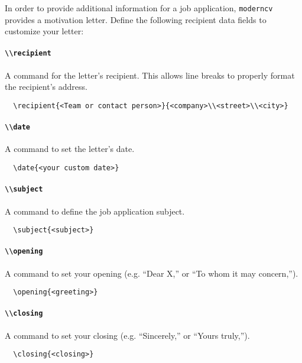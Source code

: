 \documentclass[a4paper, 11pt]{article}
\newcommand{\code}[1]{\lstinline!#1!}
\newcommand{\moderncv}{\code{moderncv}}
\begin{document}
In order to provide additional information for a job application, {\moderncv} provides a motivation letter. Define the following recipient data fields to customize your letter:
\paragraph{\code{\\recipient}}
A command for the letter's recipient. This allows line breaks to properly format the recipient's address.
\begin{lstlisting}
  \recipient{<Team or contact person>}{<company>\\<street>\\<city>}
\end{lstlisting}

\paragraph{\code{\\date}}
A command to set the letter's date.
\begin{lstlisting}
  \date{<your custom date>}
\end{lstlisting}

\paragraph{\code{\\subject}}
A command to define the job application subject.
\begin{lstlisting}
  \subject{<subject>}
\end{lstlisting}

\paragraph{\code{\\opening}}
A command to set your opening (e.g. ``Dear X,'' or ``To whom it may concern,'').
\begin{lstlisting}
  \opening{<greeting>}
\end{lstlisting}

\paragraph{\code{\\closing}}
A command to set your closing (e.g. ``Sincerely,'' or ``Yours truly,'').
\begin{lstlisting}
  \closing{<closing>}
\end{lstlisting}
\end{document}
